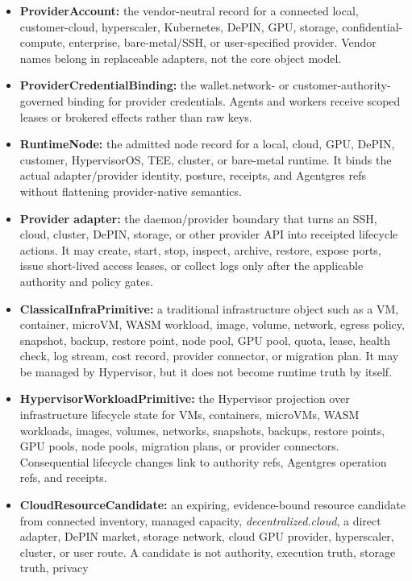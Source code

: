 \documentclass[
  11pt,
]{article}
\providecommand{\tightlist}{%
  \setlength{\itemsep}{0pt}\setlength{\parskip}{0pt}}
\begin{document}
\begin{itemize}
\tightlist
\item
  \textbf{ProviderAccount:} the vendor-neutral record for a connected
  local, customer-cloud, hyperscaler, Kubernetes, DePIN, GPU, storage,
  confidential-compute, enterprise, bare-metal/SSH, or user-specified
  provider. Vendor names belong in replaceable adapters, not the core
  object model.
\item
  \textbf{ProviderCredentialBinding:} the wallet.network- or
  customer-authority-governed binding for provider credentials. Agents and
  workers receive scoped leases or brokered effects rather than raw keys.
\item
  \textbf{RuntimeNode:} the admitted node record for a local, cloud, GPU,
  DePIN, customer, HypervisorOS, TEE, cluster, or bare-metal runtime. It
  binds the actual adapter/provider identity, posture, receipts, and
  Agentgres refs without flattening provider-native semantics.
\item
  \textbf{Provider adapter:} the daemon/provider boundary that turns an
  SSH, cloud, cluster, DePIN, storage, or other provider API into
  receipted lifecycle actions. It may create, start, stop, inspect,
  archive, restore, expose ports, issue short-lived access leases, or
  collect logs only after the applicable authority and policy gates.
\item
  \textbf{ClassicalInfraPrimitive:} a traditional infrastructure object
  such as a VM, container, microVM, WASM workload, image, volume,
  network, egress policy, snapshot, backup, restore point, node pool,
  GPU pool, quota, lease, health check, log stream, cost record,
  provider connector, or migration plan. It may be managed by
  Hypervisor, but it does not become runtime truth by itself.
\item
  \textbf{HypervisorWorkloadPrimitive:} the Hypervisor projection over
  infrastructure lifecycle state for VMs, containers, microVMs, WASM
  workloads, images, volumes, networks, snapshots, backups, restore
  points, GPU pools, node pools, migration plans, or provider
  connectors. Consequential lifecycle changes link to authority refs,
  Agentgres operation refs, and receipts.
\item
  \textbf{CloudResourceCandidate:} an expiring, evidence-bound resource
  candidate from connected inventory, managed capacity,
  \emph{decentralized.cloud}, a direct adapter, DePIN market, storage
  network, cloud GPU provider, hyperscaler, cluster, or user route. A
  candidate is not authority, execution truth, storage truth, privacy

\end{itemize}
\end{document}

